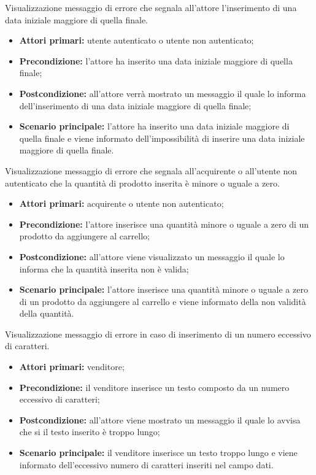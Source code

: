 
Visualizzazione messaggio di errore che segnala all'attore l'inserimento di una data iniziale maggiore di quella finale.
\begin{itemize}
    \item \textbf{Attori primari:} utente autenticato o utente non autenticato;
    \item \textbf{Precondizione:} l'attore ha inserito una data iniziale maggiore di quella finale;
    \item \textbf{Postcondizione:} all'attore verrà mostrato un messaggio il quale lo informa dell'inserimento di una data iniziale maggiore di quella finale;
    \item \textbf{Scenario principale:} l'attore ha inserito una data iniziale maggiore di quella finale e viene informato dell'impossibilità di inserire una data iniziale maggiore di quella finale.
\end{itemize}


Visualizzazione messaggio di errore che segnala all'acquirente o all'utente non autenticato che la quantità di prodotto inserita è minore o uguale a zero.
\begin{itemize}
    \item \textbf{Attori primari:} acquirente o utente non autenticato;
    \item \textbf{Precondizione:} l'attore inserisce una quantità minore o uguale a zero di un prodotto da aggiungere al carrello;
    \item \textbf{Postcondizione:} all'attore viene visualizzato un messaggio il quale lo informa che la quantità inserita non è valida;
    \item \textbf{Scenario principale:} l'attore inserisce una quantità minore o uguale a zero di un prodotto da aggiungere al carrello e viene informato della non validità della quantità.
\end{itemize}


Visualizzazione messaggio di errore in caso di inserimento di un numero eccessivo di caratteri.
\begin{itemize}
	\item \textbf{Attori primari:} venditore;
	\item \textbf{Precondizione:} il venditore inserisce un testo composto da un numero eccessivo di caratteri;
	\item \textbf{Postcondizione:} all'attore viene mostrato un messaggio il quale lo avvisa che si il testo inserito è troppo lungo;
	\item \textbf{Scenario principale:} il venditore inserisce un testo troppo lungo e viene informato dell'eccessivo numero di caratteri inseriti nel campo dati.
\end{itemize}


